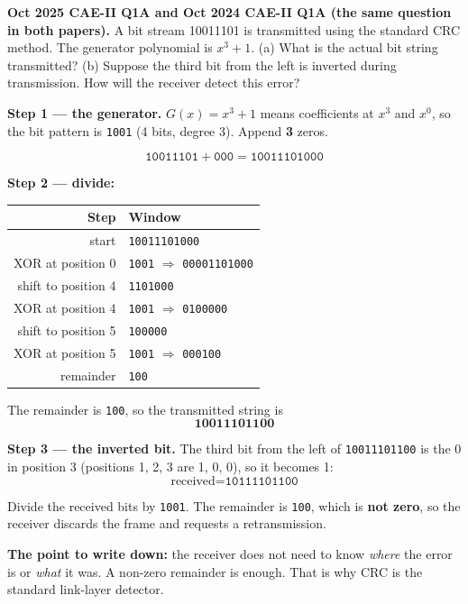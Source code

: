 \documentclass[11pt,a4paper]{article}
\begin{document}
\begin{pyqbox}
\textbf{Oct 2025 CAE-II Q1A and Oct 2024 CAE-II Q1A (the same question in both papers).} A bit stream 10011101 is transmitted using the standard CRC method. The generator polynomial is $x^3+1$. (a) What is the actual bit string transmitted? (b) Suppose the third bit from the left is inverted during transmission. How will the receiver detect this error?
\end{pyqbox}

\begin{solbox}
\textbf{Step 1 --- the generator.} $G(x) = x^3 + 1$ means coefficients at $x^3$ and $x^0$, so the bit pattern is \texttt{1001} (4 bits, degree 3). Append \textbf{3} zeros.

\[
\texttt{10011101} + \texttt{000} = \texttt{10011101000}
\]

\textbf{Step 2 --- divide:}

\begin{center}\small
\begin{tabular}{r|l}
\toprule Step & Window\\
\midrule
start & \texttt{10011101000}\\
XOR at position 0 & \texttt{1001} $\Rightarrow$ \texttt{00001101000}\\
shift to position 4 & \texttt{1101000}\\
XOR at position 4 & \texttt{1001} $\Rightarrow$ \texttt{0100000}\\
shift to position 5 & \texttt{100000}\\
XOR at position 5 & \texttt{1001} $\Rightarrow$ \texttt{000100}\\
remainder & \texttt{100}\\
\bottomrule
\end{tabular}
\end{center}

The remainder is \texttt{100}, so the transmitted string is
\[
\textbf{10011101100}
\]

\textbf{Step 3 --- the inverted bit.} The third bit from the left of \texttt{10011101100} is the 0 in position 3 (positions 1, 2, 3 are 1, 0, 0), so it becomes 1:
\[
\text{received} = \texttt{10111101100}
\]

Divide the received bits by \texttt{1001}. The remainder is \texttt{100}, which is \textbf{not zero}, so the receiver discards the frame and requests a retransmission.

\textbf{The point to write down:} the receiver does not need to know \emph{where} the error is or \emph{what} it was. A non-zero remainder is enough. That is why CRC is the standard link-layer detector.
\end{solbox}
\end{document}
